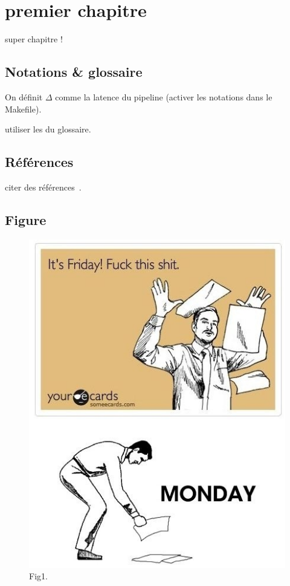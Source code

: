 
\chapter{premier chapitre}

super chapitre !

\section{Notations \& glossaire}

On définit $\Delta$ comme la latence du pipeline (activer les notations dans le Makefile).

utiliser les {\id} du glossaire.

\section{Références}

citer des références~\cite{Aksoy2012OAM}.

\section{Figure}

\begin{figure}[h!]
\begin{center}
\includegraphics[width=14cm]
{images/pic1.jpg}
\caption{Fig1.\label{fig:fig1}}
\end{center}
\end{figure}

